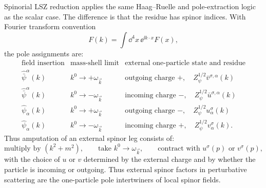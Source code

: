 \begin{definition}
\label{def:spinorial-lsz-pole-assignment}
Spinorial LSZ reduction applies the same Haag--Ruelle and pole-extraction
logic as the scalar case. The difference is that the residue has spinor
indices. With Fourier transform convention
\[
  F(k)=\int\dd^4x\,\ee^{\ii k\cdot x}F(x),
\]
the pole assignments are:
\[
\renewcommand{\arraystretch}{1.25}
\begin{array}{c|c|c}
  \text{field insertion} & \text{mass-shell limit}
  & \text{external one-particle state and residue} \\ \hline
  \widehat{\bar\psi}^{\alpha}(k)
  & k^0\to+\omega_{\vec k}
  & \text{outgoing charge }+,\quad
    Z_\psi^{1/2}\bar v^{\sigma,\alpha}(k)\\
  \widehat{\bar\psi}^{\alpha}(k)
  & k^0\to-\omega_{\vec k}
  & \text{incoming charge }-,\quad
    Z_\psi^{1/2}\bar u^{\sigma,\alpha}(k)\\
  \widehat\psi_\alpha(k)
  & k^0\to+\omega_{\vec k}
  & \text{outgoing charge }-,\quad
    Z_\psi^{1/2}u_\alpha^\sigma(k)\\
  \widehat\psi_\alpha(k)
  & k^0\to-\omega_{\vec k}
  & \text{incoming charge }+,\quad
    Z_\psi^{1/2}v_\alpha^\sigma(k).
\end{array}
\]
Thus amputation of an external spinor leg consists of:
\[
  \text{multiply by }(k^2+m^2),\qquad
  \text{take }k^0\to\omega_{\vec k},\qquad
  \text{contract with }u^\sigma(p)\text{ or }v^\sigma(p),
\]
with the choice of \(u\) or \(v\) determined by the external charge and by
whether the particle is incoming or outgoing. Thus external spinor factors in
perturbative scattering are the one-particle pole intertwiners of local
spinor fields.
\end{definition}

\begin{center}
\end{center}


